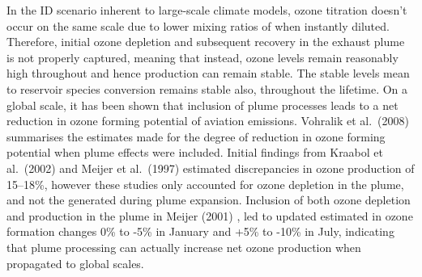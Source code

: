 In the ID scenario inherent to large-scale climate models, ozone titration doesn't occur on the same scale due to lower mixing ratios of  when instantly diluted. Therefore, initial ozone depletion and subsequent recovery in the exhaust plume is not properly captured, meaning that instead, ozone levels remain reasonably high throughout and hence  production can remain stable. The stable  levels mean  to reservoir species conversion remains stable also, throughout the  lifetime. On a global scale, it has been shown that inclusion of plume processes leads to a net reduction in ozone forming potential of aviation  emissions. Vohralik et al.\ (2008) \cite{Vohralik2008} summarises the estimates made for the degree of reduction in ozone forming potential when plume effects were included. Initial findings from Kraabol et al.\ (2002) \cite{Kraabol2002} and Meijer et al.\ (1997) \cite{Meijer1997} estimated discrepancies in ozone production of 15--18\%, however these studies only accounted for ozone depletion in the plume, and not the  generated during plume expansion. Inclusion of both ozone depletion and production in the plume in Meijer (2001) \cite{Meijer2001}, led to updated estimated in ozone formation changes 0\% to -5\% in January and +5\% to -10\% in July, indicating that plume processing can actually increase net ozone production when propagated to global scales. %



